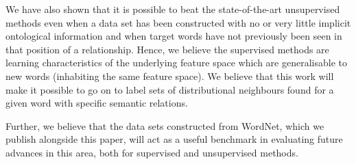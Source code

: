 \documentclass[11pt]{article}
\begin{document}
We have also shown that it is possible to beat the state-of-the-art unsupervised methods even when a data set has been constructed with no or very little implicit ontological information and when target words have not previously been seen in that position of a relationship.  Hence, we believe the supervised methods are learning characteristics of the underlying feature space which are generalisable to new words (inhabiting the same feature space).  We believe that this work will make it possible to go on to label sets of distributional neighbours found for a given word with specific semantic relations.

Further, we believe that the data sets constructed from WordNet, which we publish alongside this paper,  will act as a useful benchmark in evaluating future advances in this area, both for supervised and unsupervised methods.



\end{document}
